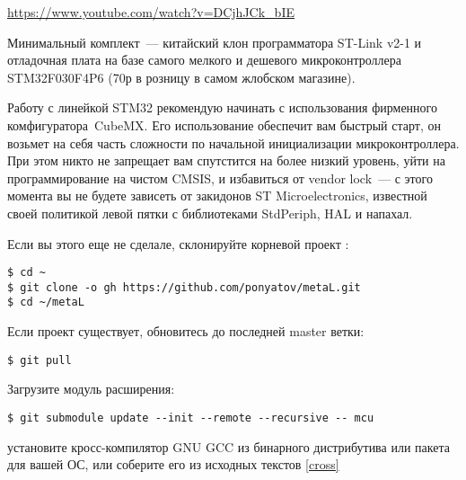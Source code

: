 \secdown

\url{https://www.youtube.com/watch?v=DCjhJCk_bIE}

\href{https://www.aliexpress.com/item/FREE-SHIPPING-ST-Link-V2-stlink-mini-STM8STM32-STLINK-simulator-download-programming-With-Cover/1814606455.html}{}
\href{https://www.aliexpress.com/item/48-MHz-STM32F030F4P6-Small-Systems-Development-Board-CORTEX-M0-Core-32bit-Mini-System-Development-Panels/32831635311.html}{}

\noindent
Минимальный комплект\ --- китайский клон программатора ST-Link v2-1 и отладочная
плата на базе самого мелкого и дешевого микроконтроллера STM32F030F4P6 (70р в
розницу в самом жлобском магазине).

\bigskip
Работу с линейкой STM32 рекомендую начинать с использования фирменного
комфигуратора\ CubeMX.
Его использование обеспечит вам быстрый старт, он возьмет на себя часть
сложности по начальной инициализации микроконтроллера. При этом никто не
запрещает вам спутстится на более низкий уровень, уйти на программирование на
чистом CMSIS, и избавиться от vendor lock\ --- с этого момента вы не будете
зависеть от закидонов ST Microelectronics, известной своей политикой левой пятки
с библиотеками StdPeriph, HAL и напахал.


\noindent
Если вы этого еще не сделале, склонируйте корневой проект \metal:

\begin{verbatim}
$ cd ~
$ git clone -o gh https://github.com/ponyatov/metaL.git
$ cd ~/metaL
\end{verbatim}
Если проект существует, обновитесь до последней master ветки:
\begin{verbatim}
$ git pull
\end{verbatim}
Загрузите модуль расширения:
\begin{verbatim}
$ git submodule update --init --remote --recursive -- mcu
\end{verbatim}
установите кросс-компилятор GNU GCC из бинарного дистрибутива или пакета для
вашей ОС, или соберите его из исходных текстов
\ref{cross}


